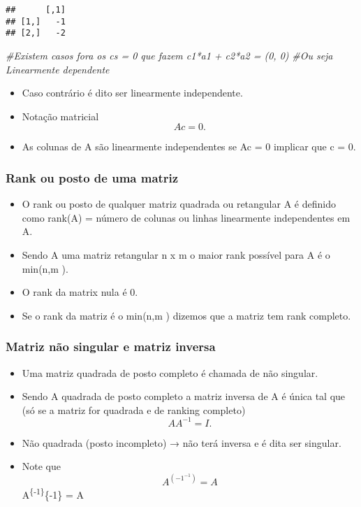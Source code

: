 \documentclass[
]{article}
\newenvironment{Shaded}{\begin{snugshade}}{\end{snugshade}}
\newcommand{\CommentTok}[1]{\textcolor[rgb]{0.56,0.35,0.01}{\textit{#1}}}
\providecommand{\tightlist}{%
  \setlength{\itemsep}{0pt}\setlength{\parskip}{0pt}}
\begin{document}
\begin{verbatim}
##      [,1]
## [1,]   -1
## [2,]   -2
\end{verbatim}

\begin{Shaded}
\begin{Highlighting}[]
\CommentTok{\#Existem casos fora os cs = 0 que fazem c1*a1 + c2*a2 = (0, 0)}
\CommentTok{\#Ou seja Linearmente dependente}
\end{Highlighting}
\end{Shaded}

\begin{itemize}
\tightlist
\item
  Caso contrário é dito ser linearmente independente.
\item
  Notação matricial \[
  Ac = 0.
  \]
\item
  As colunas de A são linearmente independentes se Ac = 0 implicar que c
  = 0.
\end{itemize}

\hypertarget{rank-ou-posto-de-uma-matriz}{%
\subsubsection{Rank ou posto de uma
matriz}\label{rank-ou-posto-de-uma-matriz}}

\begin{itemize}
\tightlist
\item
  O rank ou posto de qualquer matriz quadrada ou retangular A é definido
  como rank(A) = número de colunas ou linhas linearmente independentes
  em A.
\item
  Sendo A uma matriz retangular n x m o maior rank possível para A é o
  min(n,m ).
\item
  O rank da matrix nula é 0.
\item
  Se o rank da matriz é o min(n,m ) dizemos que a matriz tem rank
  completo.
\end{itemize}

\hypertarget{matriz-nuxe3o-singular-e-matriz-inversa}{%
\subsubsection{Matriz não singular e matriz
inversa}\label{matriz-nuxe3o-singular-e-matriz-inversa}}

\begin{itemize}
\tightlist
\item
  Uma matriz quadrada de posto completo é chamada de não singular.
\item
  Sendo A quadrada de posto completo a matriz inversa de A é única tal
  que (só se a matriz for quadrada e de ranking completo) \[
  AA^{-1} = I.
  \]
\item
  Não quadrada (posto incompleto) → não terá inversa e é dita ser
  singular.
\item
  Note que \[
  A^{(-1^{-1})} =A
  \] A\textsuperscript{\{-1\}}\{-1\} = A
\end{itemize}
\end{document}
